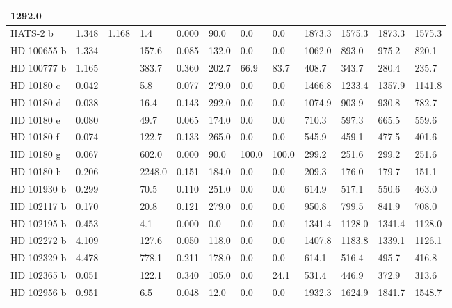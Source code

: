 \documentclass[letterpaper,10pt,english]{sphinxmanual}
\begin{document}
\begin{longtable}{|l|l|l|l|l|l|l|l|l|l|l|l|}
1292.0
\\
\hline
HATS-2 b
 & 
1.348
 & 
1.168
 & 
1.4
 & 
0.000
 & 
90.0
 & 
0.0
 & 
0.0
 & 
1873.3
 & 
1575.3
 & 
1873.3
 & 
1575.3
\\
\hline
HD 100655 b
 & 
1.334
 &  & 
157.6
 & 
0.085
 & 
132.0
 & 
0.0
 & 
0.0
 & 
1062.0
 & 
893.0
 & 
975.2
 & 
820.1
\\
\hline
HD 100777 b
 & 
1.165
 &  & 
383.7
 & 
0.360
 & 
202.7
 & 
66.9
 & 
83.7
 & 
408.7
 & 
343.7
 & 
280.4
 & 
235.7
\\
\hline
HD 10180 c
 & 
0.042
 &  & 
5.8
 & 
0.077
 & 
279.0
 & 
0.0
 & 
0.0
 & 
1466.8
 & 
1233.4
 & 
1357.9
 & 
1141.8
\\
\hline
HD 10180 d
 & 
0.038
 &  & 
16.4
 & 
0.143
 & 
292.0
 & 
0.0
 & 
0.0
 & 
1074.9
 & 
903.9
 & 
930.8
 & 
782.7
\\
\hline
HD 10180 e
 & 
0.080
 &  & 
49.7
 & 
0.065
 & 
174.0
 & 
0.0
 & 
0.0
 & 
710.3
 & 
597.3
 & 
665.5
 & 
559.6
\\
\hline
HD 10180 f
 & 
0.074
 &  & 
122.7
 & 
0.133
 & 
265.0
 & 
0.0
 & 
0.0
 & 
545.9
 & 
459.1
 & 
477.5
 & 
401.6
\\
\hline
HD 10180 g
 & 
0.067
 &  & 
602.0
 & 
0.000
 & 
90.0
 & 
100.0
 & 
100.0
 & 
299.2
 & 
251.6
 & 
299.2
 & 
251.6
\\
\hline
HD 10180 h
 & 
0.206
 &  & 
2248.0
 & 
0.151
 & 
184.0
 & 
0.0
 & 
0.0
 & 
209.3
 & 
176.0
 & 
179.7
 & 
151.1
\\
\hline
HD 101930 b
 & 
0.299
 &  & 
70.5
 & 
0.110
 & 
251.0
 & 
0.0
 & 
0.0
 & 
614.9
 & 
517.1
 & 
550.6
 & 
463.0
\\
\hline
HD 102117 b
 & 
0.170
 &  & 
20.8
 & 
0.121
 & 
279.0
 & 
0.0
 & 
0.0
 & 
950.8
 & 
799.5
 & 
841.9
 & 
708.0
\\
\hline
HD 102195 b
 & 
0.453
 &  & 
4.1
 & 
0.000
 & 
0.0
 & 
0.0
 & 
0.0
 & 
1341.4
 & 
1128.0
 & 
1341.4
 & 
1128.0
\\
\hline
HD 102272 b
 & 
4.109
 &  & 
127.6
 & 
0.050
 & 
118.0
 & 
0.0
 & 
0.0
 & 
1407.8
 & 
1183.8
 & 
1339.1
 & 
1126.1
\\
\hline
HD 102329 b
 & 
4.478
 &  & 
778.1
 & 
0.211
 & 
178.0
 & 
0.0
 & 
0.0
 & 
614.1
 & 
516.4
 & 
495.7
 & 
416.8
\\
\hline
HD 102365 b
 & 
0.051
 &  & 
122.1
 & 
0.340
 & 
105.0
 & 
0.0
 & 
24.1
 & 
531.4
 & 
446.9
 & 
372.9
 & 
313.6
\\
\hline
HD 102956 b
 & 
0.951
 &  & 
6.5
 & 
0.048
 & 
12.0
 & 
0.0
 & 
0.0
 & 
1932.3
 & 
1624.9
 & 
1841.7
 & 
1548.7
\\

\end{longtable}
\end{document}
